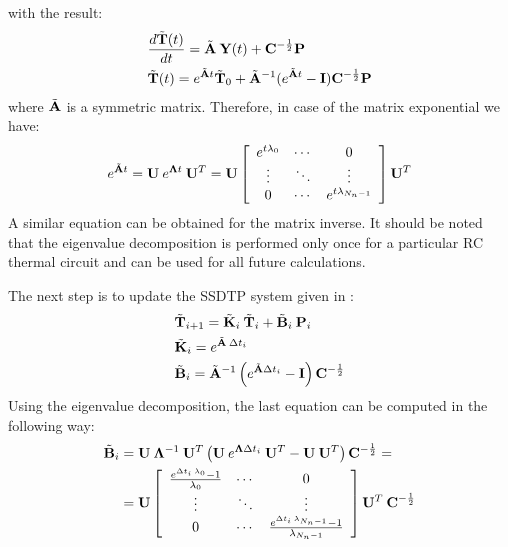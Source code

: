 with the result:
\begin{align*}
  & \frac{d\tilde{\mathbf{T}}(t)}{dt} = \tilde{\mathbf{A}} \: \mathbf{Y}(t) + \mathbf{C}^{-\frac{1}{2}} \mathbf{P} \\
  & \tilde{\mathbf{T}}(t) = e^{\tilde{\mathbf{A}} t} \tilde{\mathbf{T}}_0 + \tilde{\mathbf{A}}^{-1} (e^{\tilde{\mathbf{A}} t} - \mathbf{I}) \mathbf{C}^{-\frac{1}{2}} \mathbf{P}
\end{align*}
where $\tilde{\mathbf{A}}$ is a symmetric matrix. Therefore, in case of the matrix exponential we have:
\[
  e^{\tilde{\mathbf{A}} t} = \mathbf{U} \: e^{\mathbf{\Lambda} t} \: \mathbf{U}^T = \mathbf{U} \left[
      \begin{array}{ccc}
        e^{t \lambda_0} & \cdots & 0 \\
        \vdots & \ddots & \vdots \\
        0 & \cdots & e^{t \lambda_{N_n - 1}}
      \end{array}
    \right] \mathbf{U}^T
\]
A similar equation can be obtained for the matrix inverse. It should be noted that the eigenvalue decomposition is performed only once for a particular RC thermal circuit and can be used for all future calculations.

The next step is to update the SSDTP system given in :
\begin{align}
  & \tilde{\mathbf{T}}_{i+1} = \tilde{\mathbf{K}}_i \: \tilde{\mathbf{T}}_i + \tilde{\mathbf{B}}_i \: \mathbf{P}_i \label{eq:recurrent-equation} \\
  & \tilde{\mathbf{K}}_i = e^{\tilde{\mathbf{A}} \: \Delta t_i} \nonumber \\
  & \tilde{\mathbf{B}}_i = \tilde{\mathbf{A}}^{-1} \left( e^{\tilde{\mathbf{A}} \Delta t_i} - \mathbf{I} \right) \mathbf{C}^{-\frac{1}{2}} \nonumber
\end{align}
Using the eigenvalue decomposition, the last equation can be computed in the following way:
\begin{align*}
  \tilde{\mathbf{B}}_i & = \mathbf{U} \: \mathbf{\Lambda}^{-1} \: \mathbf{U}^T \left(\mathbf{U} \: e^{\mathbf{\Lambda} \Delta t_i} \: \mathbf{U}^T - \mathbf{U} \: \mathbf{U}^T \right) \mathbf{C}^{-\frac{1}{2}} = \\
      & = \mathbf{U} \left[
        \begin{array}{ccc}
          \frac{e^{\Delta t_i \: \lambda_0} - 1}{\lambda_0} & \cdots & 0 \\
          \vdots & \ddots & \vdots \\
          0 & \cdots & \frac{e^{\Delta t_i \: \lambda_{N_n - 1}} - 1}{\lambda_{N_n - 1}}
        \end{array}
      \right] \mathbf{U}^T \: \mathbf{C}^{-\frac{1}{2}}
\end{align*}

